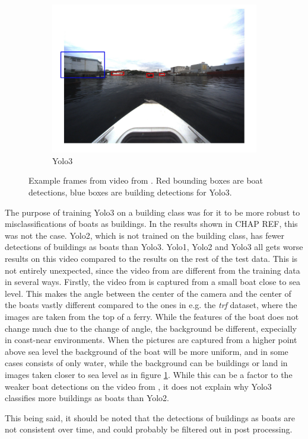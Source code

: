 \begin{figure}[h!]
\begin{subfigure}[b]{0.6\textwidth}
   \includegraphics[width=1\linewidth]{results/kamsvag/yolo3_figure_1479.jpg}
   \caption{Yolo3}
\end{subfigure}
\caption{Example frames from video from \citep{Kamsvag2018}. Red bounding boxes are boat detections, blue boxes are building detections for Yolo3.}
\label{fig:kamsvaag_vid}
\end{figure}


The purpose of training Yolo3 on a building class was for it to be more robust to misclassifications of boats as buildings. In the results shown in CHAP REF, this was not the case. Yolo2, which is not trained on the building class, has fewer detections of buildings as boats than Yolo3. Yolo1, Yolo2 and Yolo3 all gets worse results on this video compared to the results on the rest of the test data. This is not entirely unexpected, since the video from \citep{Kamsvag2018} are different from the training data in several ways. Firstly, the video from \citep{Kamsvag2018} is captured from a small boat close to sea level. This makes the angle between the center of the camera and the center of the boats vastly different compared to the ones in e.g. the \textit{trf} dataset, where the images are taken from the top of a ferry. While the features of the boat does not change much due to the change of angle, the background be different, expecially in coast-near environments. When the pictures are captured from a higher point above sea level the background of the boat will be more uniform, and in some cases consists of only water, while the background can be buildings or land in images taken closer to sea level as in figure \ref{fig:kamsvaag_vid}. While this can be a factor to the weaker boat detections on the video from \citep{Kamsvag2018}, it does not explain why Yolo3 classifies more buildings as boats than Yolo2.

\vspace{3mm}

This being said, it should be noted that the detections of buildings as boats are not consistent over time, and could probably be filtered out in post processing.